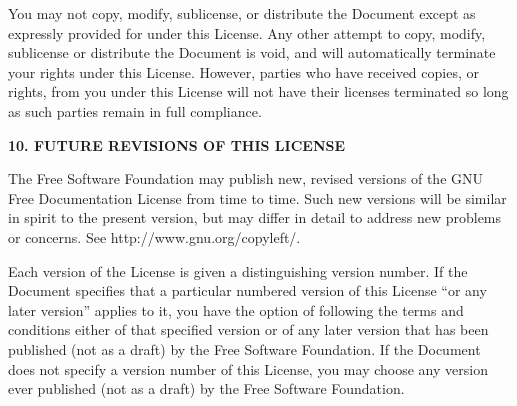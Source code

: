 You may not copy, modify, sublicense, or distribute the Document
except as expressly provided for under this License.  Any other
attempt to copy, modify, sublicense or distribute the Document is
void, and will automatically terminate your rights under this
License.  However, parties who have received copies, or rights, from
you under this License will not have their licenses terminated so
long as such parties remain in full compliance.


\begin{center}
{\Large\bfseries 10. FUTURE REVISIONS OF THIS LICENSE\par} 
\end{center}


The Free Software Foundation may publish new, revised versions of
the GNU Free Documentation License from time to time.  Such new
versions will be similar in spirit to the present version, but may
differ in detail to address new problems or concerns.  See
http://www.gnu.org/copyleft/.

Each version of the License is given a distinguishing version
number. If the Document specifies that a particular numbered version
of this License ``or any later version'' applies to it, you have the
option of following the terms and conditions either of that
specified version or of any later version that has been published
(not as a draft) by the Free Software Foundation.  If the Document
does not specify a version number of this License, you may choose
any version ever published (not as a draft) by the Free Software
Foundation. 



